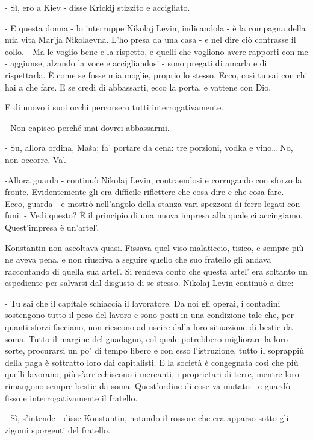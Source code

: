 - Sì, ero a Kiev - disse Krickij stizzito e accigliato. 

- E questa donna - lo interruppe Nikolaj Levin, indicandola - è la compagna della mia vita Mar'ja Nikolaevna. L'ho presa da una casa - e nel dire ciò contrasse il collo. - Ma le voglio bene e la rispetto, e quelli che vogliono avere rapporti con me - aggiunse, alzando la voce e accigliandosi - sono pregati di amarla e di rispettarla. È come se fosse mia moglie, proprio lo stesso. Ecco, così tu sai con chi hai a che fare. E se credi di abbassarti, ecco la porta, e vattene con Dio. 

E di nuovo i suoi occhi percorsero tutti interrogativamente. 

- Non capisco perché mai dovrei abbassarmi. 

- Su, allora ordina, Maša; fa' portare da cena: tre porzioni, vodka e vino\ldots{} No, non occorre. Va'. 

-Allora guarda - continuò Nikolaj Levin, contraendosi e corrugando con sforzo la fronte. Evidentemente gli era difficile riflettere che cosa dire e che cosa fare. - Ecco, guarda - e mostrò nell'angolo della stanza vari spezzoni di ferro legati con funi. - Vedi questo? È il principio di una nuova impresa alla quale ci accingiamo. Quest'impresa è un'artel'. 

Konstantin non ascoltava quasi. Fissava quel viso malaticcio, tisico, e sempre più ne aveva pena, e non riusciva a seguire quello che suo fratello gli andava raccontando di quella sua artel'. Si rendeva conto che questa artel' era soltanto un espediente per salvarsi dal disgusto di se stesso. Nikolaj Levin continuò a dire: 

- Tu sai che il capitale schiaccia il lavoratore. Da noi gli operai, i contadini sostengono tutto il peso del lavoro e sono posti in una condizione tale che, per quanti sforzi facciano, non riescono ad uscire dalla loro situazione di bestie da soma. Tutto il margine del guadagno, col quale potrebbero migliorare la loro sorte, procurarsi un po' di tempo libero e con esso l'istruzione, tutto il soprappiù della paga è sottratto loro dai capitalisti. E la società è congegnata così che più quelli lavorano, più s'arricchiscono i mercanti, i proprietari di terre, mentre loro rimangono sempre bestie da soma. Quest'ordine di cose va mutato - e guardò fisso e interrogativamente il fratello. 

- Sì, s'intende - disse Konstantin, notando il rossore che era apparso sotto gli zigomi sporgenti del fratello. 

